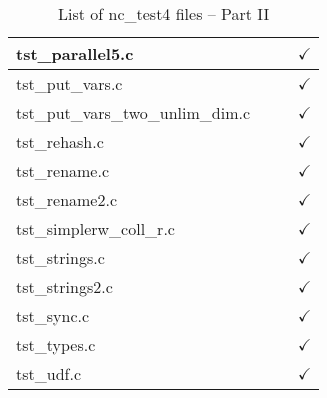 \begin{table}[H]
\begin{tabular}{|l|c|c|c|}
tst\_parallel5.c        &               &               & $\checkmark$    \\ \hline
tst\_put\_vars.c        &               &               & $\checkmark$    \\ \hline
tst\_put\_vars\_two\_unlim\_dim.c  &    &               & $\checkmark$    \\ \hline
tst\_rehash.c           &               &               & $\checkmark$    \\ \hline
tst\_rename.c           &               &               & $\checkmark$    \\ \hline
tst\_rename2.c          &               &               & $\checkmark$    \\ \hline
tst\_simplerw\_coll\_r.c   &            &               & $\checkmark$    \\ \hline
tst\_strings.c          &               &               & $\checkmark$    \\ \hline
tst\_strings2.c         &               &               & $\checkmark$    \\ \hline
tst\_sync.c             &               &               & $\checkmark$    \\ \hline
tst\_types.c            &               &               & $\checkmark$    \\ \hline
tst\_udf.c              &               &               & $\checkmark$    \\ \hline
\hline
\end{tabular}
\caption{\label{tab:nc_test4_2} List of nc\_test4 files -- Part II}
\end{table}

